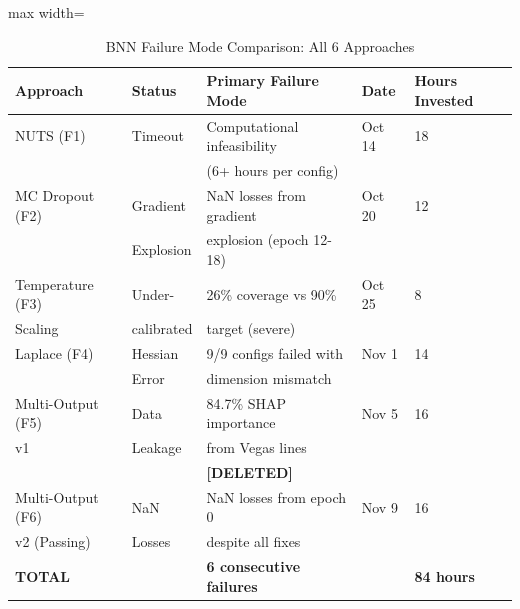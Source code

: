 

\begin{table}[htbp]
\centering
\caption{BNN Failure Mode Comparison: All 6 Approaches}
\label{tab:bnn_failure_comparison}
\begin{adjustbox}{max width=\textwidth}
\begin{tabular}{lllll}
\toprule
\textbf{Approach} & \textbf{Status} & \textbf{Primary Failure Mode} & \textbf{Date} & \textbf{Hours Invested} \\
\midrule
NUTS (F1) & Timeout & Computational infeasibility & Oct 14 & 18 \\
         & & (6+ hours per config) & & \\
\midrule
MC Dropout (F2) & Gradient & NaN losses from gradient & Oct 20 & 12 \\
                & Explosion & explosion (epoch 12-18) & & \\
\midrule
Temperature (F3) & Under- & 26\% coverage vs 90\% & Oct 25 & 8 \\
Scaling         & calibrated & target (severe) & & \\
\midrule
Laplace (F4) & Hessian & 9/9 configs failed with & Nov 1 & 14 \\
            & Error & dimension mismatch & & \\
\midrule
Multi-Output (F5) & Data & 84.7\% SHAP importance & Nov 5 & 16 \\
v1               & Leakage & from Vegas lines & & \\
                 & & \textbf{[DELETED]} & & \\
\midrule
Multi-Output (F6) & NaN & NaN losses from epoch 0 & Nov 9 & 16 \\
v2 (Passing)     & Losses & despite all fixes & & \\
\midrule
\textbf{TOTAL} & & \textbf{6 consecutive failures} & & \textbf{84 hours} \\
\bottomrule
\end{tabular}
\end{adjustbox}
\end{table}

